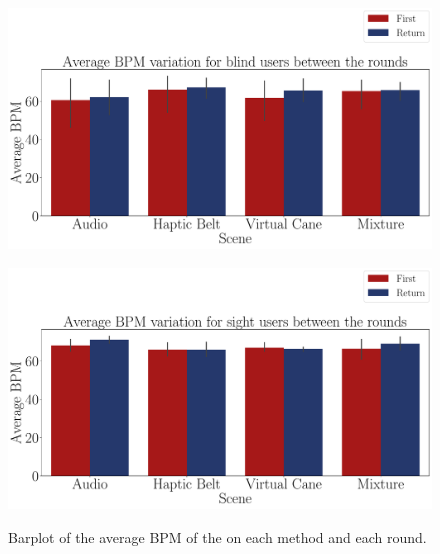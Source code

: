 \begin{figure}[!thb]
    \centering
    \begin{minipage}{\textwidth}
        \centering
        \includegraphics[width = \textwidth]{Resultados/ECG/Figuras/pdf/barplot_ecg_bpm_4_scene_blind.pdf}
        \label{fig:barplot_ecg_bpm_4_scene_blind}
    \end{minipage}
    \begin{minipage}{\textwidth}
        \centering
        \includegraphics[width = \textwidth]{Resultados/ECG/Figuras/pdf/barplot_ecg_bpm_4_scene_sight.pdf}
        \label{fig:barplot_ecg_bpm_4_scene_sight}
    \end{minipage}
    \caption{Barplot of the average BPM of the on each method and each round.}
    \label{fig:barplot_ecg_bpm_4_scene_blind_sight}
\end{figure}

